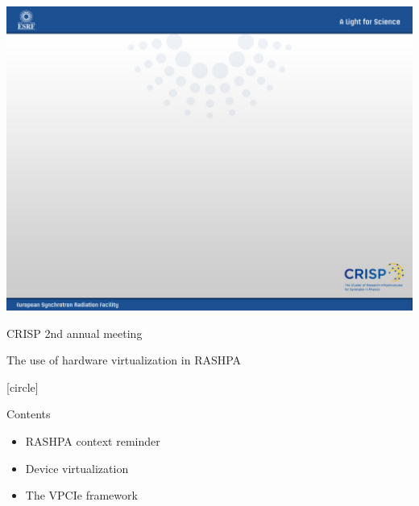 \documentclass{beamer}
\begin{document}
\usebackgroundtemplate
{
\includegraphics[height=\paperheight,width=\paperwidth]{pic/esrf_crisp/esrf_crisp_default.jpeg}
}

\begin{frame}{CRISP 2nd annual meeting}
\begin{center}
The use of hardware virtualization in RASHPA
\end{center}
\end{frame}

[circle]
\begin{frame}{Contents}
  \begin{itemize}
  \item RASHPA context reminder
  \item Device virtualization
  \item The VPCIe framework
  \end{itemize}
\end{frame}
\end{document}
